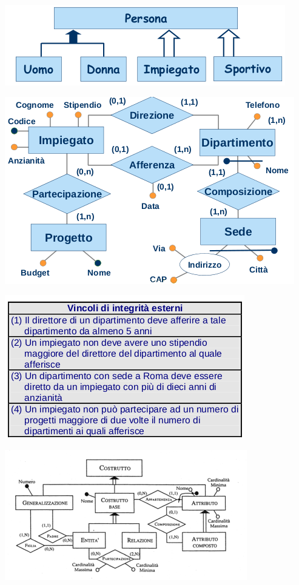 \documentclass[a4paper,12pt, oneside]{book}
\begin{document}
\begin{center}
\includegraphics[scale=0.8]{img/isa7.png}
\end{center}
\begin{center}
\includegraphics[scale=2.5]{img/vin.png}
\end{center}
\begin{center}
\includegraphics[scale=0.7]{img/vin2.png}
\end{center}
\begin{center}
\includegraphics[scale=0.8]{img/vin3.png}
\end{center}
\end{document}
